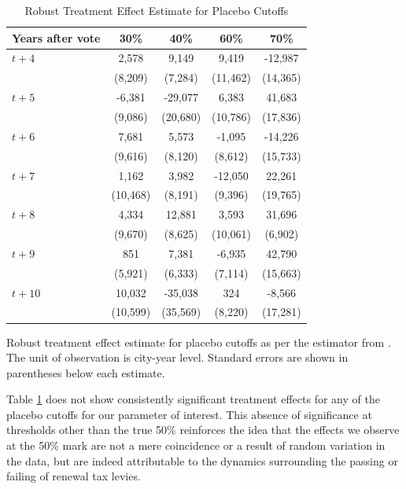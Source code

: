 \begin{table}[ht]
    \centering
    \caption{Robust Treatment Effect Estimate for Placebo Cutoffs}
    \label{tab:placebo_cutoffs}
    \begin{tabular}{p{2cm}cccc}
        \hline
        Years after vote & 30\% & 40\% & 60\% & 70\% \\
        \hline
        $t + 4$ & 2,578 & 9,149 & 9,419 & -12,987 \\
                & (8,209) & (7,284) & (11,462) & (14,365) \\
        $t + 5$ & -6,381 & -29,077 & 6,383 & 41,683 \\
                & (9,086) & (20,680) & (10,786) & (17,836) \\
        $t + 6$ & 7,681 & 5,573 & -1,095 & -14,226 \\
                & (9,616) & (8,120) & (8,612) & (15,733) \\
        $t + 7$ & 1,162 & 3,982 & -12,050 & 22,261 \\
                & (10,468) & (8,191) & (9,396) & (19,765) \\
        $t + 8$ & 4,334 & 12,881 & 3,593 & 31,696 \\
                & (9,670) & (8,625) & (10,061) & (6,902) \\
        $t + 9$ & 851 & 7,381 & -6,935 & 42,790 \\
                & (5,921) & (6,333) & (7,114) & (15,663) \\
        $t + 10$ & 10,032 & -35,038 & 324 & -8,566 \\
                 & (10,599) & (35,569) & (8,220) & (17,281) \\
        \hline
    \end{tabular}
    \begin{tablenotes}
        \small
        \item Robust treatment effect estimate for placebo cutoffs as per the estimator from \cite{calonico2017rdrobust}. The unit of observation is city-year level. Standard errors are shown in parentheses below each estimate.
    \end{tablenotes}
\end{table}


Table \ref{tab:placebo_cutoffs} does not show consistently significant treatment effects for any of the placebo cutoffs for our parameter of interest. This absence of significance at thresholds other than the true 50\% reinforces the idea that the effects we observe at the 50\% mark are not a mere coincidence or a result of random variation in the data, but are indeed attributable to the dynamics surrounding the passing or failing of renewal tax levies. 

